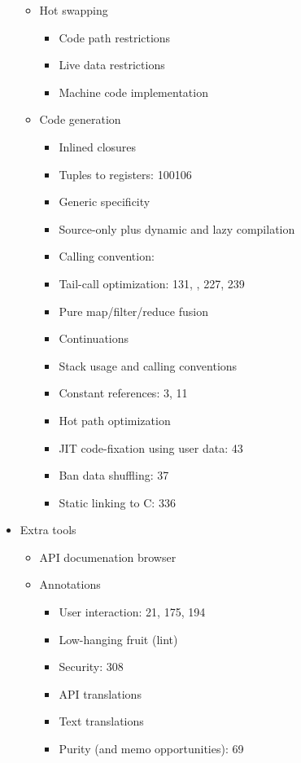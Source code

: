 \begin{itemize}
\begin{itemize}
\begin{itemize}
    \end{itemize}
  \item Hot swapping
    \begin{itemize}
    \item Code path restrictions
    \item Live data restrictions
    \item Machine code implementation
    \end{itemize}
  \item Code generation
    \begin{itemize}
    \item Inlined closures
    \item Tuples to registers: 100106
    \item Generic specificity
    \item Source-only plus dynamic and lazy compilation
    \item Calling convention: \cite{LTUG}
    \item Tail-call optimization: 131, \cite{LTUG}, 227, 239
    \item Pure map/filter/reduce fusion
    \item Continuations
    \item Stack usage and calling conventions
    \item Constant references: 3, 11
    \item Hot path optimization
    \item JIT code-fixation using user data: 43
    \item Ban data shuffling: 37
    \item Static linking to C: 336
    \end{itemize}
  \end{itemize}
\item Extra tools
  \begin{itemize}
  \item API documenation browser
  \item Annotations
    \begin{itemize}
    \item User interaction: 21, 175, 194
    \item Low-hanging fruit (lint)
    \item Security: 308
    \item API translations
    \item Text translations
    \item Purity (and memo opportunities): 69

\end{itemize}
\end{itemize}
\end{itemize}
